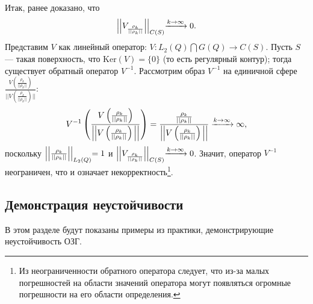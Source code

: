 \documentclass[a4paper]{article}
\begin{document}
Итак, ранее доказано, что $$\Bigl|\Bigl|V_{\frac{\rho_k}{||\rho_k ||}}  \Bigl|\Bigl|_{C(S)}\xrightarrow{k \rightarrow \infty} 0.$$
Представим $V$ как линейный оператор: $V: L_2(Q) \bigcap G(Q) \rightarrow C(S)$. Пусть $S$ --- такая поверхность, что $\text{Ker} (V)=\{0\}$ (то есть регулярный контур);
тогда существует обратный оператор $V^{-1}$.
Рассмотрим образ $V^{-1}$ на единичной сфере $\frac{V\left(\frac{\rho_k}{||\rho_k ||}\right)}{||V\left(\frac{\rho_k}{||\rho_k ||}\right)||}$:
\begin{equation}
  V^{-1}\left(\frac{V\left(\frac{\rho_k}{||\rho_k ||}\right)}{\Bigl|\Bigl|V\left(\frac{\rho_k}{||\rho_k ||}\right)\Bigl|\Bigl|}\right)=\frac{\frac{\rho_k}{||\rho_k ||}}{\Bigl|\Bigl|V\left(\frac{\rho_k}{||\rho_k ||}\right)\Bigl|\Bigl|} \xrightarrow{k\rightarrow \infty} \infty,
\end{equation}
поскольку $\Bigl|\Bigl|\frac{\rho_k}{||\rho_k ||}\Bigl|\Bigl|_{L_2(Q)}=1$ и $\Bigl|\Bigl|V_{\frac{\rho_k}{||\rho_k ||}}  \Bigl|\Bigl|_{C(S)}\xrightarrow{k \rightarrow \infty} 0$.
Значит, оператор $V^{-1}$ неограничен, что и означает некорректность\footnote{Из неограниченности обратного оператора следует, что из-за малых погрешностей на области значений оператора могут появляться огромные погрешности на его области определения.}.

\subsection{Демонстрация неустойчивости}
В этом разделе будут показаны примеры из практики, демонстрирующие неустойчивость ОЗГ.
\end{document}
